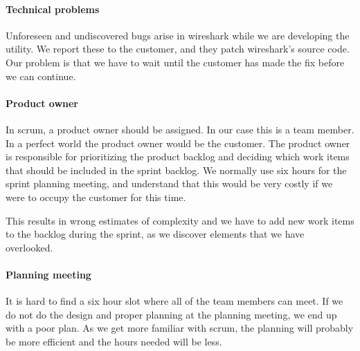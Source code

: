 \paragraph{Technical problems} 
Unforeseen and undiscovered bugs arise in \Gls{wireshark} while we are developing the \gls{utility}. We report these to the customer, and they patch \Gls{wireshark}'s source code. Our problem is that we have to wait until the customer has made the fix before we can continue.

\paragraph{Product owner}
In \Gls{scrum}, a product owner should be assigned. In our case this is a team member. In a perfect world the product owner would be the customer. The product owner is responsible for prioritizing the product backlog and deciding which work items that should be included in the sprint backlog. We normally use six hours for the sprint planning meeting, and understand that this would be very costly if we were to occupy the customer for this time.

This results in wrong estimates of complexity and we have to add new work items to the backlog during the sprint, as we discover elements that we have overlooked. 

\paragraph{Planning meeting}
It is hard to find a six hour slot where all of the team members can meet. If we do not do the design and proper planning at the planning meeting, we end up with a poor plan. As we get more familiar with \Gls{scrum}, the planning will probably be more efficient and the hours needed will be less. 

